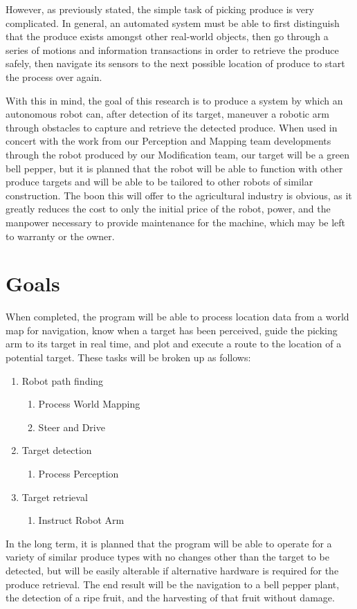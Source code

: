 \documentclass[titlepage]{article}
\begin{document}
However, as previously stated, the simple task of picking produce is very complicated. In general, an automated system must be able to first distinguish that the produce exists amongst other real-world objects, then go through a series of motions and information transactions in order to retrieve the produce safely, then navigate its sensors to the next possible location of produce to start the process over again.


With this in mind, the goal of this research is to produce a system by which an autonomous robot can, after detection of its target, maneuver a robotic arm through obstacles to capture and retrieve the detected produce. When used in concert with the work from our Perception and Mapping team developments through the robot produced by our Modification team, our target will be a green bell pepper, but it is planned that the robot will be able to function with other produce targets and will be able to be tailored to other robots of similar construction. The boon this will offer to the agricultural industry is obvious, as it greatly reduces the cost to only the initial price of the robot, power, and the manpower necessary to provide maintenance for the machine, which may be left to warranty or the owner.
\section{Goals}
When completed, the program will be able to process location data from a world map for navigation, know when a target has been perceived, guide the picking arm to its target in real time, and plot and execute a route to the location of a potential target. These tasks will be broken up as follows:
\begin{enumerate}
\item Robot path finding
\begin{enumerate}
\item Process World Mapping
\item Steer and Drive
\end{enumerate}
\item Target detection
\begin{enumerate}
\item Process Perception
\end{enumerate}
\item Target retrieval
\begin{enumerate}
\item Instruct Robot Arm
\end{enumerate}
\end{enumerate}
In the long term, it is planned that the program will be able to operate for a variety of similar produce types with no changes other than the target to be detected, but will be easily alterable if alternative hardware is required for the produce retrieval. The end result will be the navigation to a bell pepper plant, the detection of a ripe fruit, and the harvesting of that fruit without damage.
\end{document}
